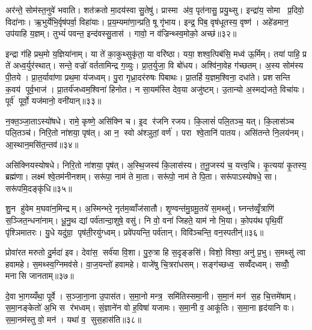अर॑न्ते॒ सोम॑स्त॒नुवे॑ भवाति। शत॑क्रतो मा॒दय॑स्वा सु॒तेषु॑। प्रास्मा अ॑व॒ पृत॑नासु॒ प्रयु॒थ्सु। इन्द्रा॑य॒ सोमा प्र॒दिवो॒ विदा॑नाः। ऋ॒भुर्येभि॒र्वृष॑पर्वा॒ विहा॑याः। प्र॒य॒म्यमा॑णा॒न्प्रति॒ षू गृ॑भाय। इन्द्र॒ पिब॒ वृष॑धूतस्य॒ वृष्ण॑। अहे॑डमान॒ उप॑याहि य॒ज्ञम्। तुभ्यं॑ पवन्त॒ इन्द॑वस्सु॒तास॑। गावो॒ न व॑ज्रिन्थ्स्व॒मोको॒ अच्छ॑॥३२॥

इन्द्रा ग॑हि प्रथ॒मो य॒ज्ञिया॑नाम्। या ते॑ का॒कुथ्सुकृ॑ता॒ या वरि॑ष्ठा। यया॒ शश्व॒त्पिब॑सि॒ मध्व॑ ऊ॒र्मिम्। तया॑ पाहि॒ प्र ते॑ अध्व॒र्युर॑स्थात्। सन्ते॒ वज्रो॑ वर्ततामिन्द्र ग॒व्युः। प्रा॒त॒र्युजा॒ वि बो॑धय। अश्वि॑ना॒वेह ग॑च्छतम्। अ॒स्य सोम॑स्य पी॒तये। प्रा॒त॒र्यावा॑णा प्रथ॒मा य॑जध्वम्। पु॒रा गृध्रा॒दर॑रुषः पिबाथः। प्रा॒तर्\mbox{}हि य॒ज्ञम॒श्विना॒ दधा॑ते। प्रशसन्ति क॒वय॑ पूर्व॒भाज॑। प्रा॒तर्य॑जध्वम॒श्विना॑ हिनोत। न सा॒यम॑स्ति देव॒या अजु॑ष्टम्। उ॒तान्यो अ॒स्मद्य॑जते॒ विचा॑यः। पूर्व॑ पूर्वो॒ यज॑मानो॒ वनी॑यान्॥३३॥\anuvakamend[चा॒श्व॒जिद्यो ग॑च्छतन्नो॒ दाश॒न्नामा॑भि॒श्रीर्ग॑मेम स॒प्रथा॑ भजामहे विशन्तु या॒ह्य॑र्वाङच्छ॑ पिबाथ॒ष्षट्च॑]

न॒क्त॒ञ्जा॒ताऽस्यो॑षधे। रामे॒ कृष्णे॒ असि॑क्नि च। इ॒द र॑जनि रजय। कि॒लासं॑ पलि॒तञ्च॒ यत्। कि॒लास॑ञ्च पलि॒तञ्च॑। निरि॒तो ना॑शया॒ पृष॑त्। आ न॒ स्वो अ॑श्ञुतां॒ वर्ण॑। परा श्वे॒तानि॑ पातय। असि॑तन्ते नि॒लय॑नम्। आ॒स्थान॒मसि॑त॒न्तव॑॥३४॥

असि॑क्नियस्योषधे। निरि॒तो ना॑शया॒ पृष॑त्। अ॒स्थि॒जस्य॑ कि॒लास॑स्य। त॒नू॒जस्य॑ च॒ यत्त्व॒चि। कृ॒त्यया॑ कृ॒तस्य॒ ब्रह्म॑णा। लक्ष्म॑ श्वे॒तम॑नीनशम्। सरू॑पा॒ नाम॑ ते मा॒ता। सरू॑पो॒ नाम॑ ते पि॒ता। सरू॑पाऽस्योषधे॒ सा। सरू॑पमि॒दङ्कृ॑धि॥३५॥

शु॒न हु॑वेम म॒घवा॑न॒मिन्द्रम्। अ॒स्मिन्भरे॒ नृत॑म॒व्वाँज॑सातौ। शृ॒ण्वन्त॑मु॒ग्रमू॒तये॑ स॒मथ्सु॑। घ्नन्त॑व्वृँ॒त्राणि॑ स॒ञ्जित॒न्धना॑नाम्। धू॒नु॒थ द्यां पर्व॑तान्दा॒शुषे॒ वसु॑। नि वो॒ वना॑ जिहते॒ याम॑ नो भि॒या। को॒पय॑थ पृथि॒वीं पृ॑श्ञिमातरः। यु॒धे यदु॑ग्रा॒ पृष॑ती॒रयु॑ग्ध्वम्। प्रवे॑पयन्ति॒ पर्व॑तान्। विवि॑ञ्चन्ति॒ वन॒स्पतीन्॑॥३६॥

प्रोवा॑रत मरुतो दु॒र्मदा॑ इव। देवा॑स॒ सर्व॑या वि॒शा। पु॒रु॒त्रा हि स॒दृङ्ङसि॑। विशो॒ विश्वा॒ अनु॑ प्र॒भु। स॒मथ्सु॑ त्वा हवामहे। स॒मथ्स्व॒ग्निमव॑से। वा॒ज॒यन्तो॑ हवामहे। वाजे॑षु चि॒त्ररा॑धसम्। सङ्ग॑च्छध्व॒ सव्वँ॑दध्वम्। सव्वोँ॒ मनासि जानताम्॥३७॥

दे॒वा भा॒गय्यँथा॒ पूर्वे। स॒ञ्जा॒ना॒ना उ॒पास॑त। स॒मा॒नो मन्त्र॒ समि॑तिस्समा॒नी। स॒मा॒नं मन॑ स॒ह चि॒त्तमे॑षाम्। स॒मा॒नङ्केतो॑ अ॒भि स र॑भध्वम्। सं॒ज्ञाने॑न वो ह॒विषा॑ यजामः। स॒मा॒नी व॒ आकू॑तिः। स॒मा॒ना हृद॑यानि वः। स॒मा॒नम॑स्तु वो॒ मन॑। यथा॑ व॒ सुस॒हास॑ति॥३८॥


